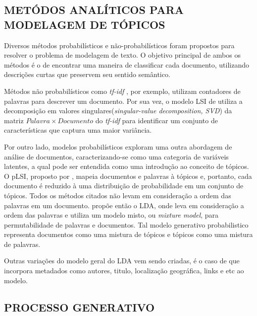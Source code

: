 \documentclass[12pt,a4paper]{article}
\begin{document}


\subsection{METÓDOS ANALÍTICOS PARA MODELAGEM DE TÓPICOS} \label{sec:trabalhos-relacionados}

Diversos métodos probabilísticos e não-probabilísticos foram propostos para resolver o problema de modelagem de texto. O objetivo
 principal de ambos os métodos é o de encontrar uma maneira de classificar cada documento, utilizando descrições curtas que preservem
 seu sentido semântico.

Métodos não probabilísticos como \textit{tf-idf} \cite{salton1983introduction}, por exemplo, utilizam contadores de palavras para descrever um documento.
 Por sua vez, o modelo LSI de  utiliza a decomposição em valores singulares(\textit{singular-value decomposition, SVD}) da
 matriz $Palavra \times Documento$ do \textit{tf-idf} para identificar um conjunto de características que captura uma maior variância.

Por outro lado, modelos probabilísticos exploram uma outra abordagem de análise de documentos, caracterizando-se como uma categoria de variáveis latentes, a qual pode ser entendida como uma introdução ao conceito de tópicos. O pLSI, proposto por , 
 mapeia documentos e palavras à tópicos e, portanto, cada documento é reduzido à uma distribuição de probabilidade em um conjunto de tópicos.
 Todos os métodos citados não levam em consideração a ordem das palavras em um documento.  propõe então o
 LDA, onde leva em consideração a ordem das palavras e utiliza um modelo misto, ou \textit{mixture model}, para permutabilidade de palavras e documentos. Tal
 modelo generativo probabilistico representa documentos como uma mistura de tópicos e tópicos como uma mistura de palavras.

Outras variações do modelo geral do LDA vem sendo criadas, é o caso de 
 que incorpora metadados como autores, titulo, localização geográfica, links e etc ao modelo.
\subsection{PROCESSO GENERATIVO} \label{sec:processo-generativo}
\end{document}
